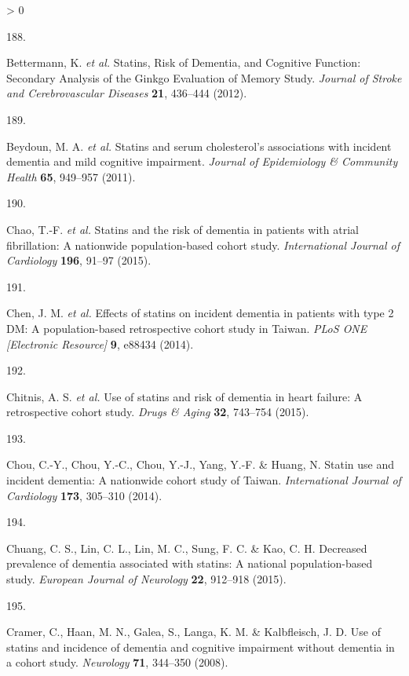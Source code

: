\documentclass[a4paper, twoside]{templates/ociamthesis}
\newlength{\cslhangindent}
\newlength{\csllabelwidth}
\newenvironment{CSLReferences}[3] %
 {%
  \setlength{\parindent}{0pt}
  \ifodd #1 \everypar{\setlength{\hangindent}{\cslhangindent}}\ignorespaces\fi
  \ifnum #2 > 0
  \setlength{\parskip}{#2\baselineskip}
  \fi
 }%
 {}
\newcommand{\CSLLeftMargin}[1]{\parbox[t]{\maxof{\widthof{#1}}{\csllabelwidth}}{#1}}
\newcommand{\CSLRightInline}[1]{\parbox[t]{\linewidth - \csllabelwidth}{#1}}
\begin{document}
\begin{CSLReferences}{0}{0}
\leavevmode\hypertarget{ref-bettermann2012}{}%
\CSLLeftMargin{188. }
\CSLRightInline{Bettermann, K. \emph{et al.} Statins, {Risk} of {Dementia}, and {Cognitive Function}: Secondary {Analysis} of the {Ginkgo Evaluation} of {Memory Study}. \emph{Journal of Stroke and Cerebrovascular Diseases} \textbf{21}, 436--444 (2012).}

\leavevmode\hypertarget{ref-beydoun2011}{}%
\CSLLeftMargin{189. }
\CSLRightInline{Beydoun, M. A. \emph{et al.} Statins and serum cholesterol's associations with incident dementia and mild cognitive impairment. \emph{Journal of Epidemiology \& Community Health} \textbf{65}, 949--957 (2011).}

\leavevmode\hypertarget{ref-chao2015}{}%
\CSLLeftMargin{190. }
\CSLRightInline{Chao, T.-F. \emph{et al.} Statins and the risk of dementia in patients with atrial fibrillation: A nationwide population-based cohort study. \emph{International Journal of Cardiology} \textbf{196}, 91--97 (2015).}

\leavevmode\hypertarget{ref-chen2014}{}%
\CSLLeftMargin{191. }
\CSLRightInline{Chen, J. M. \emph{et al.} Effects of statins on incident dementia in patients with type 2 {DM}: A population-based retrospective cohort study in {Taiwan}. \emph{PLoS ONE {[}Electronic Resource{]}} \textbf{9}, e88434 (2014).}

\leavevmode\hypertarget{ref-chitnis2015}{}%
\CSLLeftMargin{192. }
\CSLRightInline{Chitnis, A. S. \emph{et al.} Use of statins and risk of dementia in heart failure: A retrospective cohort study. \emph{Drugs \& Aging} \textbf{32}, 743--754 (2015).}

\leavevmode\hypertarget{ref-chou2014}{}%
\CSLLeftMargin{193. }
\CSLRightInline{Chou, C.-Y., Chou, Y.-C., Chou, Y.-J., Yang, Y.-F. \& Huang, N. Statin use and incident dementia: A nationwide cohort study of {Taiwan}. \emph{International Journal of Cardiology} \textbf{173}, 305--310 (2014).}

\leavevmode\hypertarget{ref-chuang2015}{}%
\CSLLeftMargin{194. }
\CSLRightInline{Chuang, C. S., Lin, C. L., Lin, M. C., Sung, F. C. \& Kao, C. H. Decreased prevalence of dementia associated with statins: A national population-based study. \emph{European Journal of Neurology} \textbf{22}, 912--918 (2015).}

\leavevmode\hypertarget{ref-cramer2008}{}%
\CSLLeftMargin{195. }
\CSLRightInline{Cramer, C., Haan, M. N., Galea, S., Langa, K. M. \& Kalbfleisch, J. D. Use of statins and incidence of dementia and cognitive impairment without dementia in a cohort study. \emph{Neurology} \textbf{71}, 344--350 (2008).}


\end{CSLReferences}
\end{document}
